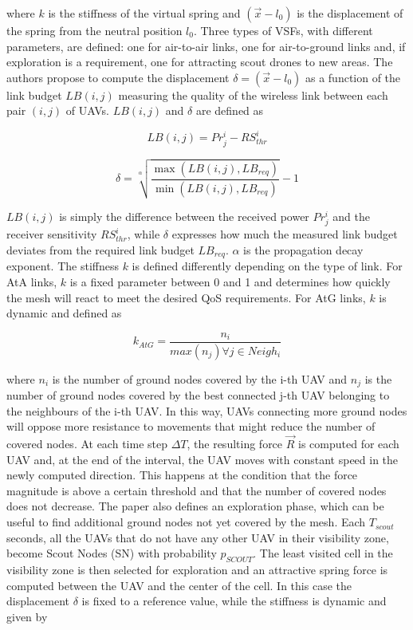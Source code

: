 where $k$ is the stiffness of the virtual spring and $(\overrightarrow{x} - l_0)$ is the displacement of the spring from the neutral position $l_0$. Three types of \glspl{VSF}, with different parameters, are defined: one for air-to-air links, one for air-to-ground links and, if exploration is a requirement, one for attracting scout drones to new areas. The authors propose to compute the displacement $\delta = (\overrightarrow{x} - l_0)$ as a function of the link budget $LB(i,j)$ measuring the quality of the wireless link between each pair $(i,j)$ of \glspl{UAV}. $LB(i,j)$ and $\delta$ are defined as

\begin{equation}
	LB(i,j) = Pr^i_j - RS^i_{thr}
\end{equation}  

\begin{equation}
	\delta = \sqrt[\alpha]{\frac{\max(LB(i,j), LB_{req})}{\min(LB(i,j), LB_{req})}} - 1
\end{equation}

$LB(i,j)$ is simply the difference between the received power $Pr^i_j$ and the receiver sensitivity $RS^i_{thr}$, while $\delta$ expresses how much the measured link budget deviates from the required link budget $LB_{req}$. $\alpha$ is the propagation decay exponent. The stiffness $k$ is defined differently depending on the type of link. For AtA links, $k$ is a fixed parameter between 0 and 1 and determines how quickly the mesh will react to meet the desired QoS requirements. For AtG links, $k$ is dynamic and defined as

\begin{equation}
	k_{AtG} = \frac{n_i}{max(n_j)\forall j \in Neigh_i}
\end{equation}

where $n_i$ is the number of ground nodes covered by the i-th \gls{UAV} and $n_j$ is the number of ground nodes covered by the best connected j-th \gls{UAV} belonging to the neighbours of the i-th \gls{UAV}. In this way, \glspl{UAV} connecting more ground nodes will oppose more resistance to movements that might reduce the number of covered nodes. At each time step $\Delta T$, the resulting force $\overrightarrow{R}$ is computed for each \gls{UAV} and, at the end of the interval, the \gls{UAV} moves with constant speed in the newly computed direction. This happens at the condition that the force magnitude is above a certain threshold and that the number of covered nodes does not decrease. The paper also defines an exploration phase, which can be useful to find additional ground nodes not yet covered by the mesh. Each $T_{scout}$ seconds, all the \glspl{UAV} that do not have any other \gls{UAV} in their visibility zone, become Scout Nodes (SN) with probability $p_{SCOUT}$. The least visited cell in the visibility zone is then selected for exploration and an attractive spring force is computed between the \gls{UAV} and the center of the cell. In this case the displacement $\delta$ is fixed to a reference value, while the stiffness is dynamic and given by


